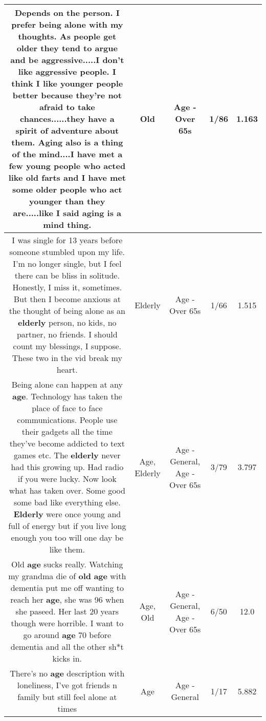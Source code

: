 \documentclass[11pt]{article}
\newlength\mylength
\begin{document}
\begin{center}
\begin{longtable}{|C{.65\mylength}|C{.30\mylength}|C{.12\mylength}|C{.12\mylength}|C{.12\mylength}|}
  \small Depends on the person. I prefer being alone with my thoughts.  As people get older they tend to argue and be aggressive.....I don't like aggressive people. I think I like younger people better because they're not afraid to take chances......they have a spirit of adventure about them.  Aging also is a thing of the mind....I have met a few young people who acted like \textbf{old} farts and I have met some older people who act younger than they are.....like I said aging is a mind thing.\normalsize   & Old & Age - Over 65s & 1/86 & 1.163 \\  \hline
  \small I was single for 13 years before someone stumbled upon my life.  I'm no longer single, but I feel there can be bliss in solitude.  Honestly, I miss it, sometimes.  But then I become anxious at the thought of being alone as an \textbf{elderly} person, no kids, no partner, no friends.  I should count my blessings, I suppose.  These two in the vid break my heart.\normalsize   & Elderly & Age - Over 65s & 1/66 & 1.515 \\  \hline
  \small Being alone can happen at any \textbf{age}. Technology has taken the place of face to face communications. People use their gadgets all the time they've become addicted to text games etc. The \textbf{elderly} never had this growing up. Had radio if you were lucky. Now look what has taken over. Some good some bad like everything else. \textbf{Elderly} were once young and full of energy but if you live long enough you too will one day be like them.\normalsize   & Age, Elderly & Age - General, Age - Over 65s & 3/79 & 3.797 \\  \hline
  \small Old \textbf{age} sucks really. Watching my grandma die of \textbf{old} \textbf{age} with dementia put me off wanting to reach her \textbf{age}, she was 96 when she paseed. Her last 20 years though were horrible. I want to go around \textbf{age} 70 before dementia and all the other sh*t kicks in.\normalsize   & Age, Old & Age - General, Age - Over 65s & 6/50 & 12.0 \\  \hline
  \small There's no \textbf{age} description with loneliness, I've got friends n family but still feel alone at times\normalsize   & Age & Age - General & 1/17 & 5.882 \\  \hline

\end{longtable}
\end{center}
\end{document}
